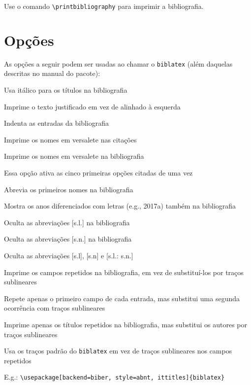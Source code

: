 \documentclass[a4paper]{article}
\begin{document}
Use o comando \verb"\printbibliography" para imprimir a bibliografia.

\clearpage
\section{Opções}%
\label{sec:opções}

As opções a seguir podem ser usadas ao chamar o \texttt{biblatex} (além daquelas descritas no manual do pacote):

\begin{description}[itemindent=-1em,leftmargin=3em]%
  \item [ittitles] Usa itálico para os títulos na bibliografia
  \item [justify] Imprime o texto justificado em vez de alinhado à esquerda
  \item [indent] Indenta as entradas da bibliografia
  \item [sccite] Imprime os nomes em versalete nas citações
  \item [scbib] Imprime os nomes em versalete na bibliografia
  \item [pretty] Essa opção ativa as cinco primeiras opções citadas de uma vez
  \item [giveninits] Abrevia os primeiros nomes na bibliografia
  \item [extrayear] Mostra os anos diferenciados com letras (e.g., 2017a) também na bibliografia
  \item [nosl] Oculta as abreviações [s.l.] na bibliografia
  \item [nosn] Oculta as abreviações [s.n.] na bibliografia
  \item [noslsn] Oculta as abreviações [s.l], [s.n] e [s.l.: s.n.]
  \item [repeatfields] Imprime os campos repetidos na bibliografia, em vez de
    substituí-los por traços sublineares
  \item [repeatfirstfields] Repete apenas o primeiro campo de cada entrada,
    mas substitui uma segunda ocorrência com traços sublineares
  \item [repeattitles] Imprime apenas os títulos repetidos na bibliografia,
    mas substitui os autores por traços sublineares
  \item [usedashes] Usa os traços padrão do \texttt{biblatex} em vez de
    traços sublineares nos campos repetidos
\end{description}%

\vspace{\baselineskip}
E.g.: \verb"\usepackage[backend=biber, style=abnt, ittitles]{biblatex}"
\end{document}
